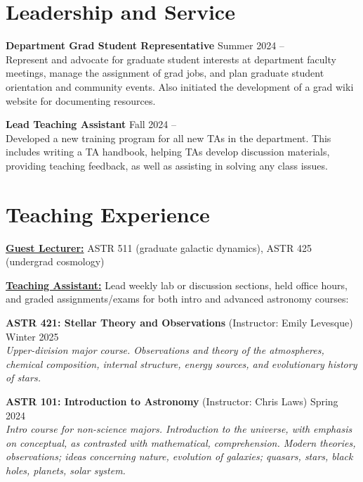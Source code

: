 \documentclass[a4,11pt]{article}
\begin{document}
\section{Leadership and Service}

\textbf{Department Grad Student Representative} \hfill Summer 2024 -- \\
Represent and advocate for graduate student interests at department faculty meetings, manage the assignment of grad jobs, and plan graduate student orientation and community events. Also initiated the development of a grad wiki website for documenting resources.
\vspace{.2cm}

\textbf{Lead Teaching Assistant} \hfill Fall 2024 -- \\ 
Developed a new training program for all new TAs in the department. This includes writing a TA handbook, helping TAs develop discussion materials, providing teaching feedback, as well as assisting in solving any class issues. 
\vspace{.2cm}


\section{Teaching Experience}

\textbf{\underline{Guest Lecturer:}} ASTR 511 (graduate galactic dynamics), ASTR 425 (undergrad cosmology) 
\vspace{.2cm}

\textbf{\underline{Teaching Assistant:}} Lead weekly lab or discussion sections, held office hours, and graded assignments/exams for both intro and advanced astronomy courses: \vspace{.3cm} 

\textbf{ASTR 421: Stellar Theory and Observations} (Instructor: Emily Levesque) \hfill Winter 2025 \\
\textsl{Upper-division major course. Observations and theory of the atmospheres, chemical composition, internal structure, energy sources, and evolutionary history of stars.} \vspace{.2cm}

\textbf{ASTR 101: Introduction to Astronomy} (Instructor: Chris Laws) \hfill Spring 2024  \\
\textsl{Intro course for non-science majors. Introduction to the universe, with emphasis on conceptual, as contrasted with mathematical, comprehension. Modern theories, observations; ideas concerning nature, evolution of galaxies; quasars, stars, black holes, planets, solar system.} \vspace{.2cm}
\end{document}
